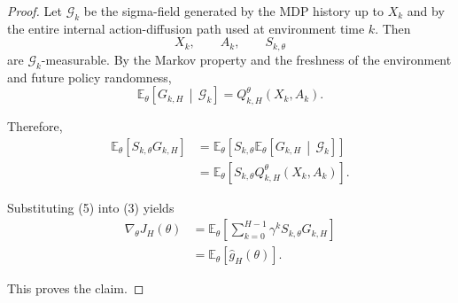 \documentclass{article}
\theoremstyle{definition}
\theoremstyle{remark}
\theoremstyle{mystyle}
\newcommand{\1}{\mathbbm{1}}
\begin{document}
\begin{proof}
Let \(\mathcal G_k\) be the sigma-field generated by the MDP history
up to \(X_k\) and by the entire internal action-diffusion path used
at environment time \(k\). Then
\[
X_k,\qquad A_k,\qquad S_{k,\theta}
\]
are \(\mathcal G_k\)-measurable. By the Markov property and the
freshness of the environment and future policy randomness,
\[
\mathbb E_\theta
\left[
G_{k,H}
\,\middle|\,
\mathcal G_k
\right]
=
Q_{k,H}^{\theta}(X_k,A_k).
\tag{4}
\]

Therefore,
\[
\begin{aligned}
\mathbb E_\theta
\left[
S_{k,\theta}G_{k,H}
\right]
&=
\mathbb E_\theta
\left[
S_{k,\theta}
\mathbb E_\theta
\left[
G_{k,H}
\,\middle|\,
\mathcal G_k
\right]
\right]
\\
&=
\mathbb E_\theta
\left[
S_{k,\theta}
Q_{k,H}^{\theta}(X_k,A_k)
\right].
\end{aligned}
\tag{5}
\]

Substituting (5) into (3) yields
\[
\begin{aligned}
\nabla_\theta J_H(\theta)
&=
\mathbb E_\theta
\left[
\sum_{k=0}^{H-1}
\gamma^kS_{k,\theta}G_{k,H}
\right]
\\
&=
\mathbb E_\theta[\widehat g_H(\theta)].
\end{aligned}
\]

This proves the claim.
\end{proof}
\end{document}
